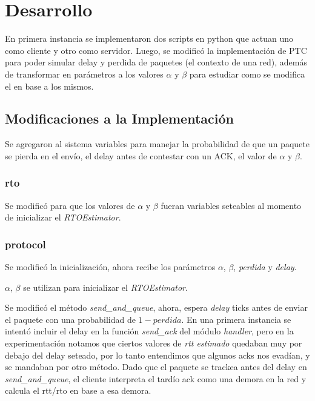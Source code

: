 \section{Desarrollo}

    En primera instancia se implementaron dos scripts en python que 
    actuan uno como cliente y otro como servidor.
    Luego, se modific\'o la implementaci\'on de PTC para poder simular
    delay y perdida de paquetes (el contexto de una red), adem\'as de transformar en par\'ametros
    a los valores $\alpha$ y $\beta$ para estudiar como se modifica el
    \rto{} en base a los mismos.  

  \subsection{Modificaciones a la Implementaci\'on}
    Se agregaron al sistema variables para manejar la probabilidad de que 
    un paquete se pierda en el env\'io, el delay antes de contestar con 
    un ACK, el valor de $\alpha$ y $\beta$.

    \subsubsection{rto}
    Se modific\'o para que los valores de $\alpha$ y $\beta$ fueran 
    variables seteables al momento de inicializar el \textit{RTOEstimator}.
    
    \subsubsection{protocol}
    Se modific\'o la inicializaci\'on, ahora recibe los par\'ametros 
    $\alpha$, $\beta$, \textit{perdida} y \textit{delay}.
    
    $\alpha$, $\beta$ se utilizan para inicializar el \textit{RTOEstimator}.
    
    Se modific\'o el m\'etodo \textit{send\_and\_queue}, ahora, espera 
    \textit{delay} ticks antes de enviar el paquete con una probabilidad
    de $1-perdida$. En una primera instancia se intent\'o incluir el delay
    en la funci\'on \textit{send\_ack} del m\'odulo \textit{handler}, pero
    en la experimentaci\'on notamos que ciertos valores de 
    \textit{rtt estimado}
    quedaban muy por debajo del delay seteado, por lo tanto entendimos que 
    algunos acks nos evad\'ian, y se mandaban por otro m\'etodo. 
    Dado que el paquete se trackea antes del delay en 
    \textit{send\_and\_queue},
    el cliente interpreta el tard\'io ack como una demora en la red y
    calcula el rtt/rto en base a esa demora.

